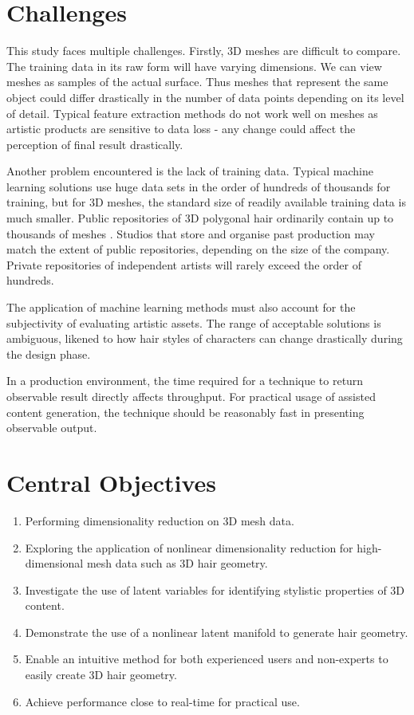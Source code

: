 \documentclass[ %
author={Dillon Keith Diep},
supervisor={Dr. Carl Henrik Ek},
degree={MEng},
title={ART-CG Hair:},
subtitle={Assisted Real-time Content Generation of Stylised Virtual Hair},
type={Research},
year={2017} ]{dissertation}
\begin{document}
\section{Challenges}
This study faces multiple challenges. Firstly, 3D meshes are difficult to compare. The training data in its raw form will have varying dimensions. We can view meshes as samples of the actual surface. Thus meshes that represent the same object could differ drastically in the number of data points depending on its level of detail. Typical feature extraction methods do not work well on meshes as artistic products are sensitive to data loss - any change could affect the perception of final result drastically.

Another problem encountered is the lack of training data. Typical machine learning solutions use huge data sets in the order of hundreds of thousands for training, but for 3D meshes, the standard size of readily available training data is much smaller. Public repositories of 3D polygonal hair ordinarily contain up to thousands of meshes \cite{tsr}. Studios that store and organise past production may match the extent of public repositories, depending on the size of the company. Private repositories of independent artists will rarely exceed the order of hundreds.

The application of machine learning methods must also account for the subjectivity of evaluating artistic assets. The range of acceptable solutions is ambiguous, likened to how hair styles of characters can change drastically during the design phase.

In a production environment, the time required for a technique to return observable result directly affects throughput. For practical usage of assisted content generation, the technique should be reasonably fast in presenting observable output.

\section{Central Objectives}
\label{chap:context:objectives}
\begin{enumerate}
	\item Performing dimensionality reduction on 3D mesh data.
	\item Exploring the application of nonlinear dimensionality reduction for high-dimensional mesh data such as 3D hair geometry.
	\item Investigate the use of latent variables for identifying stylistic properties of 3D content.
	\item Demonstrate the use of a nonlinear latent manifold to generate hair geometry.
	\item Enable an intuitive method for both experienced users and non-experts to easily create 3D hair geometry.
	\item Achieve performance close to real-time for practical use.
\end{enumerate}
\end{document}
